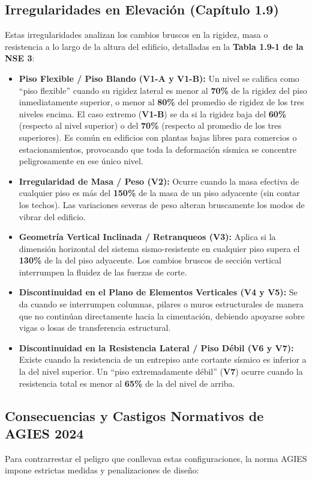 \documentclass[14pt,letterpaper]{extarticle}
\begin{document}
	\subsection{Irregularidades en Elevación (Capítulo 1.9)}
	Estas irregularidades analizan los cambios bruscos en la rigidez, masa o resistencia a lo largo de la altura del edificio, detalladas en la \textbf{Tabla 1.9-1 de la NSE 3}:
	
	\begin{itemize}
		\item \textbf{Piso Flexible / Piso Blando (V1-A y V1-B):} Un nivel se califica como ``piso flexible'' cuando su rigidez lateral es menor al \textbf{70\%} de la rigidez del piso inmediatamente superior, o menor al \textbf{80\%} del promedio de rigidez de los tres niveles encima. El caso extremo (\textbf{V1-B}) se da si la rigidez baja del \textbf{60\%} (respecto al nivel superior) o del \textbf{70\%} (respecto al promedio de los tres superiores). Es común en edificios con plantas bajas libres para comercios o estacionamientos, provocando que toda la deformación sísmica se concentre peligrosamente en ese único nivel.
		\item \textbf{Irregularidad de Masa / Peso (V2):} Ocurre cuando la masa efectiva de cualquier piso es más del \textbf{150\%} de la masa de un piso adyacente (sin contar los techos). Las variaciones severas de peso alteran bruscamente los modos de vibrar del edificio.
		\item \textbf{Geometría Vertical Inclinada / Retranqueos (V3):} Aplica si la dimensión horizontal del sistema sismo-resistente en cualquier piso supera el \textbf{130\%} de la del piso adyacente. Los cambios bruscos de sección vertical interrumpen la fluidez de las fuerzas de corte.
		\item \textbf{Discontinuidad en el Plano de Elementos Verticales (V4 y V5):} Se da cuando se interrumpen columnas, pilares o muros estructurales de manera que no continúan directamente hacia la cimentación, debiendo apoyarse sobre vigas o losas de transferencia estructural. 
		\item \textbf{Discontinuidad en la Resistencia Lateral / Piso Débil (V6 y V7):} Existe cuando la resistencia de un entrepiso ante cortante sísmico es inferior a la del nivel superior. Un ``piso extremadamente débil'' (\textbf{V7}) ocurre cuando la resistencia total es menor al \textbf{65\%} de la del nivel de arriba.
	\end{itemize}
	
	\subsection{Consecuencias y Castigos Normativos de AGIES 2024}
	Para contrarrestar el peligro que conllevan estas configuraciones, la norma AGIES impone estrictas medidas y penalizaciones de diseño:
	
\end{document}
